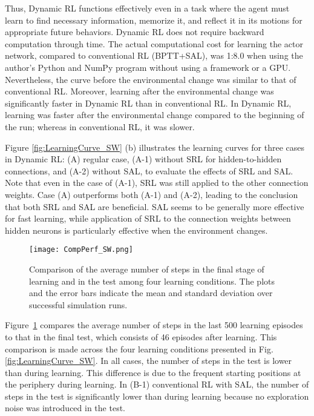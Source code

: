 Thus, Dynamic RL functions effectively even in a task where the agent must learn
to find necessary information, memorize it, and reflect it in its motions for appropriate future behaviors.
Dynamic RL does not require backward computation through time.
The actual computational cost for learning the actor network, compared to conventional RL (BPTT+SAL),
was 1:8.0 when using the author's Python and NumPy program without using a framework or a GPU. 
Nevertheless, the curve before the environmental change was similar to that of conventional RL.
Moreover, learning after the environmental change was significantly faster in Dynamic RL than in conventional RL.
In Dynamic RL, learning was faster after the environmental change compared to the beginning of the run;
whereas in conventional RL, it was slower.

Figure \ref{fig:LearningCurve_SW} (b) illustrates the learning curves for three cases in Dynamic RL:
(A) regular case, (A-1) without SRL for hidden-to-hidden connections, and (A-2) without SAL,
to evaluate the effects of SRL and SAL.
Note that even in the case of (A-1), SRL was still applied to the other connection weights.
Case (A) outperforms both (A-1) and (A-2), leading to the conclusion that both SRL and SAL are beneficial.
SAL seems to be generally more effective for fast learning, while application of SRL
to the connection weights between hidden neurons is particularly effective when the environment changes.

\begin{figure}[ht]
\centerline{\texttt{[image: CompPerf\_SW.png]}}
\caption{Comparison of the average number of steps in the final stage of learning and in the test
among four learning conditions.
The plots and the error bars indicate the mean and standard deviation over successful simulation runs.}
\label{fig:CompPerf}
\end{figure}
Figure~\ref{fig:CompPerf} compares the average number of steps in the last 500 learning episodes
to that in the final test, which consists of 46 episodes after learning.
This comparison is made across the four learning conditions presented in Fig. \ref{fig:LearningCurve_SW}.
In all cases, the number of steps in the test is lower than during learning.
This difference is due to the frequent starting positions at the periphery during learning.
In (B-1) conventional RL with SAL, the number of steps in the test is significantly lower than during learning
because no exploration noise was introduced in the test.

